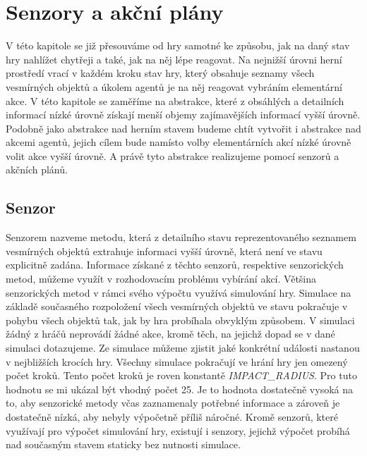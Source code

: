\chapter{Senzory a akční plány}


V této kapitole se již přesouváme od hry samotné ke způsobu, jak na daný stav hry nahlížet chytřeji a také, jak na něj lépe reagovat. 
Na nejnižší úrovni herní prostředí vrací v každém kroku stav hry, který obsahuje seznamy všech vesmírných objektů a úkolem agentů je na něj reagovat vybráním elementární akce.
V této kapitole se zaměříme na abstrakce, které z obsáhlých a detailních informací nízké úrovně získají menší objemy zajímavějších informací vyšší úrovně. 
Podobně jako abstrakce nad herním stavem budeme chtít vytvořit i abstrakce nad akcemi agentů, jejich cílem bude namísto volby elementárních akcí nízké úrovně volit akce vyšší úrovně.
A právě tyto abstrakce realizujeme pomocí senzorů a akčních plánů.
\section{Senzor}

Senzorem nazveme metodu, která z detailního stavu reprezentovaného seznamem vesmírných objektů extrahuje informaci vyšší úrovně, která není ve stavu explicitně zadána.
Informace získané z těchto senzorů, respektive senzorických metod, můžeme využít v rozhodovacím problému vybírání akcí.
Většina senzorických metod v rámci svého výpočtu využívá simulování hry. 
Simulace na základě současného rozpoložení všech vesmírných objektů ve stavu pokračuje v pohybu všech objektů tak, jak by hra probíhala obvyklým způsobem. 
V simulaci žádný z hráčů neprovádí žádné akce, kromě těch, na jejichž dopad se v dané simulaci dotazujeme.
Ze simulace můžeme zjistit jaké konkrétní události nastanou v nejbližších krocích hry.
Všechny simulace pokračují ve hrání hry jen omezený počet kroků. Tento počet kroků je roven konstantě \emph{\uppercase{Impact\_radius}}. Pro tuto hodnotu se mi ukázal být vhodný počet 25.
Je to hodnota dostatečně vysoká na to, aby senzorické metody včas zaznamenaly potřebné informace a zároveň je dostatečně nízká, aby nebyly výpočetně příliš náročné.
Kromě senzorů, které využívají pro výpočet simulování hry, existují i senzory, jejichž výpočet probíhá nad současným stavem staticky bez nutnosti simulace.



